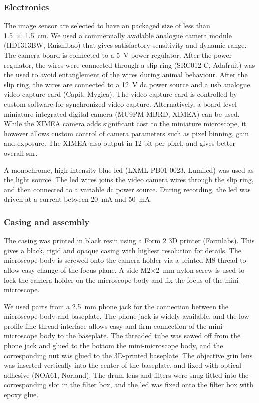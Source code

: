 \subsubsection{Electronics}
The image sensor are selected to have an packaged size of less than \SI{1.5 x 1.5}{\cm}. We used a commercially available analogue camera module (HD1313BW, Ruishibao) that gives satisfactory sensitivity and dynamic range. The camera board is connected to a \SI{5}{\V} power regulator. After the power regulator, the wires were connected through a slip ring (SRC012-C, Adafruit) was the used to avoid entanglement of the wires during animal behaviour. After the slip ring, the wires are connected to a \SI{12}{\V} \gls{dc} power source and a \gls{usb} analogue video capture card (Capit, Mygica). The video capture card is controlled by custom software for synchronized video capture.  Alternatively, a board-level miniature integrated digital camera (MU9PM-MBRD, XIMEA) can be used. While the XIMEA camera adds significant cost to the miniature microscope, it however allows custom control of camera parameters such as pixel binning, gain and exposure. The XIMEA also output in 12-bit per pixel, and gives better overall \gls{snr}.

A monochrome, high-intensity blue \gls{led} (LXML-PB01-0023, Lumiled) was used as the light source. The \gls{led} wires joins the video camera wires through the slip ring, and then connected to a variable \gls{dc} power source. During recording, the \gls{led} was driven at a current between \SI{20}{\mA} and \SI{50}{\mA}.

\subsubsection{Casing and assembly}
The casing was printed in black resin using a Form 2 3D printer (Formlabs). This gives a black, rigid and opaque casing with highest resolution for details. The microscope body is screwed onto the camera holder via a printed M8 thread to allow easy change of the focus plane. A side M2$\times$\SI{2}{\mm} nylon screw is used to lock the camera holder on the microscope body and fix the focus of the mini-microscope. 

We used parts from a \SI{2.5}{\mm} phone jack for the connection between the microscope body and baseplate. The phone jack is widely available, and the low-profile fine thread interface allows easy and firm connection of the mini-microscope body to the baseplate. The threaded tube was sawed off from the phone jack and glued to the bottom the mini-microscope body, and the corresponding nut was glued to the 3D-printed baseplate. The objective \gls{grin} lens was inserted vertically into the center of the baseplate, and fixed with optical adhesive (NOA61, Norland). The drum lens and filters were snug-fitted into the corresponding slot in the filter box, and the \gls{led} was fixed onto the filter box with epoxy glue. 


